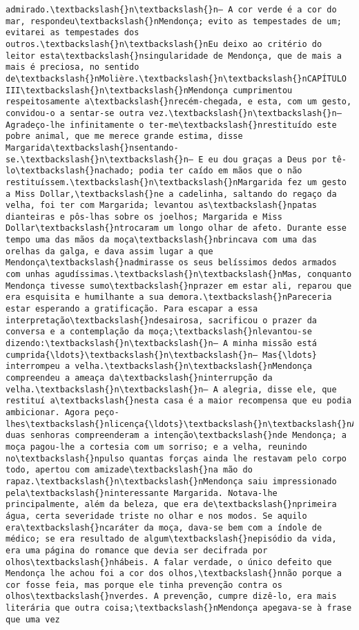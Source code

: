 \documentclass[11pt]{article}
\begin{document}
\begin{Verbatim}[commandchars=\\\{\}]
admirado.\textbackslash{}n\textbackslash{}n— A cor verde é a cor do mar, respondeu\textbackslash{}nMendonça; evito as tempestades de um; evitarei as tempestades dos outros.\textbackslash{}n\textbackslash{}nEu deixo ao critério do leitor esta\textbackslash{}nsingularidade de Mendonça, que de mais a mais é preciosa, no sentido de\textbackslash{}nMolière.\textbackslash{}n\textbackslash{}nCAPÍTULO III\textbackslash{}n\textbackslash{}nMendonça cumprimentou respeitosamente a\textbackslash{}nrecém-chegada, e esta, com um gesto, convidou-o a sentar-se outra vez.\textbackslash{}n\textbackslash{}n— Agradeço-lhe infinitamente o ter-me\textbackslash{}nrestituído este pobre animal, que me merece grande estima, disse Margarida\textbackslash{}nsentando-se.\textbackslash{}n\textbackslash{}n— E eu dou graças a Deus por tê-lo\textbackslash{}nachado; podia ter caído em mãos que o não restituíssem.\textbackslash{}n\textbackslash{}nMargarida fez um gesto a Miss Dollar,\textbackslash{}ne a cadelinha, saltando do regaço da velha, foi ter com Margarida; levantou as\textbackslash{}npatas dianteiras e pôs-lhas sobre os joelhos; Margarida e Miss Dollar\textbackslash{}ntrocaram um longo olhar de afeto. Durante esse tempo uma das mãos da moça\textbackslash{}nbrincava com uma das orelhas da galga, e dava assim lugar a que Mendonça\textbackslash{}nadmirasse os seus belíssimos dedos armados com unhas agudíssimas.\textbackslash{}n\textbackslash{}nMas, conquanto Mendonça tivesse sumo\textbackslash{}nprazer em estar ali, reparou que era esquisita e humilhante a sua demora.\textbackslash{}nPareceria estar esperando a gratificação. Para escapar a essa interpretação\textbackslash{}ndesairosa, sacrificou o prazer da conversa e a contemplação da moça;\textbackslash{}nlevantou-se dizendo:\textbackslash{}n\textbackslash{}n— A minha missão está cumprida{\ldots}\textbackslash{}n\textbackslash{}n— Mas{\ldots} interrompeu a velha.\textbackslash{}n\textbackslash{}nMendonça compreendeu a ameaça da\textbackslash{}ninterrupção da velha.\textbackslash{}n\textbackslash{}n— A alegria, disse ele, que restituí a\textbackslash{}nesta casa é a maior recompensa que eu podia ambicionar. Agora peço-lhes\textbackslash{}nlicença{\ldots}\textbackslash{}n\textbackslash{}nAs duas senhoras compreenderam a intenção\textbackslash{}nde Mendonça; a moça pagou-lhe a cortesia com um sorriso; e a velha, reunindo no\textbackslash{}npulso quantas forças ainda lhe restavam pelo corpo todo, apertou com amizade\textbackslash{}na mão do rapaz.\textbackslash{}n\textbackslash{}nMendonça saiu impressionado pela\textbackslash{}ninteressante Margarida. Notava-lhe principalmente, além da beleza, que era de\textbackslash{}nprimeira água, certa severidade triste no olhar e nos modos. Se aquilo era\textbackslash{}ncaráter da moça, dava-se bem com a índole de médico; se era resultado de algum\textbackslash{}nepisódio da vida, era uma página do romance que devia ser decifrada por olhos\textbackslash{}nhábeis. A falar verdade, o único defeito que Mendonça lhe achou foi a cor dos olhos,\textbackslash{}nnão porque a cor fosse feia, mas porque ele tinha prevenção contra os olhos\textbackslash{}nverdes. A prevenção, cumpre dizê-lo, era mais literária que outra coisa;\textbackslash{}nMendonça apegava-se à frase que uma vez 
\end{Verbatim}
\end{document}
